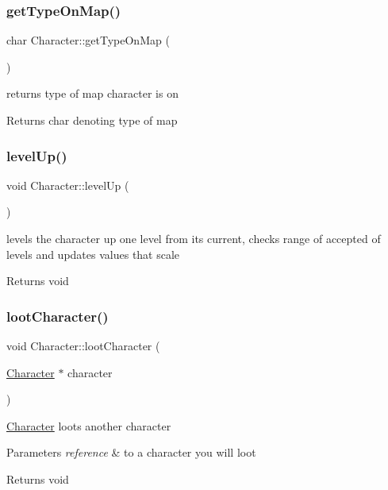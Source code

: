 \subsubsection{\texorpdfstring{get\+Type\+On\+Map()}{getTypeOnMap()}}
{\footnotesize\ttfamily char Character\+::get\+Type\+On\+Map (\begin{DoxyParamCaption}{ }\end{DoxyParamCaption})}

returns type of map character is on \begin{DoxyReturn}{Returns}
char denoting type of map 
\end{DoxyReturn}
\hypertarget{class_character_aaaffb44b62eb70df0e545700c6011210}{}\label{class_character_aaaffb44b62eb70df0e545700c6011210} 
\subsubsection{\texorpdfstring{level\+Up()}{levelUp()}}
{\footnotesize\ttfamily void Character\+::level\+Up (\begin{DoxyParamCaption}{ }\end{DoxyParamCaption})}

levels the character up one level from its current, checks range of accepted of levels and updates values that scale \begin{DoxyReturn}{Returns}
void 
\end{DoxyReturn}
\hypertarget{class_character_ad49924a7c476a923ecc9fd113c38256d}{}\label{class_character_ad49924a7c476a923ecc9fd113c38256d} 
\subsubsection{\texorpdfstring{loot\+Character()}{lootCharacter()}}
{\footnotesize\ttfamily void Character\+::loot\+Character (\begin{DoxyParamCaption}\item[{\hyperlink{class_character}{Character} $\ast$}]{character }\end{DoxyParamCaption})}

\hyperlink{class_character}{Character} loots another character 
\begin{DoxyParams}{Parameters}
{\em reference} & to a character you will loot \\
\hline
\end{DoxyParams}
\begin{DoxyReturn}{Returns}
void 
\end{DoxyReturn}
\hypertarget{class_character_a29b8aa0e775c4f1a491d9ef77b9edff3}{}\label{class_character_a29b8aa0e775c4f1a491d9ef77b9edff3} 
